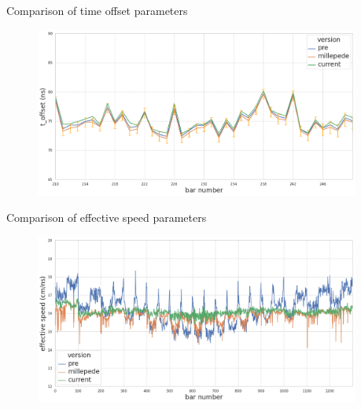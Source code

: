 \documentclass{ikpKoeln}
\begin{document}
\begin{frame}{Comparison of time offset parameters}
	\begin{figure}[t]
		\includegraphics[width = 0.95\textwidth]{R3BCon2024GSI/toffset_comp.png}
	\end{figure}
\end{frame}

\begin{frame}{Comparison of effective speed parameters}
	\begin{figure}[t]
		\includegraphics[width = 0.95\textwidth]{R3BCon2024GSI/effective_c_comp.png}
	\end{figure}
\end{frame}
\end{document}
